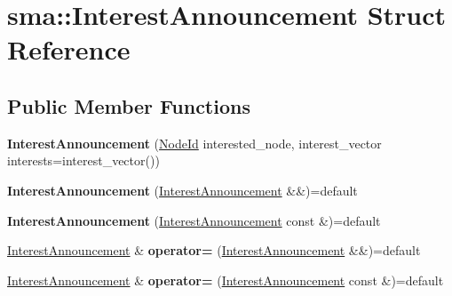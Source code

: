 \hypertarget{structsma_1_1InterestAnnouncement}{\section{sma\-:\-:Interest\-Announcement Struct Reference}
\label{structsma_1_1InterestAnnouncement}
}
\subsection*{Public Member Functions}
\begin{DoxyCompactItemize}
\item 
\hypertarget{structsma_1_1InterestAnnouncement_aebd1f782724e60862721d7e00a3e11fe}{{\bfseries Interest\-Announcement} (\hyperlink{structsma_1_1NodeId}{Node\-Id} interested\-\_\-node, interest\-\_\-vector interests=interest\-\_\-vector())}\label{structsma_1_1InterestAnnouncement_aebd1f782724e60862721d7e00a3e11fe}

\item 
\hypertarget{structsma_1_1InterestAnnouncement_ab17687b56d4191e0e3dae65c74ca5c44}{{\bfseries Interest\-Announcement} (\hyperlink{structsma_1_1InterestAnnouncement}{Interest\-Announcement} \&\&)=default}\label{structsma_1_1InterestAnnouncement_ab17687b56d4191e0e3dae65c74ca5c44}

\item 
\hypertarget{structsma_1_1InterestAnnouncement_a6f5c2300e99343d43bfa42327202832b}{{\bfseries Interest\-Announcement} (\hyperlink{structsma_1_1InterestAnnouncement}{Interest\-Announcement} const \&)=default}\label{structsma_1_1InterestAnnouncement_a6f5c2300e99343d43bfa42327202832b}

\item 
\hypertarget{structsma_1_1InterestAnnouncement_a5a4fcc3853c90e5c822499bdeba48464}{\hyperlink{structsma_1_1InterestAnnouncement}{Interest\-Announcement} \& {\bfseries operator=} (\hyperlink{structsma_1_1InterestAnnouncement}{Interest\-Announcement} \&\&)=default}\label{structsma_1_1InterestAnnouncement_a5a4fcc3853c90e5c822499bdeba48464}

\item 
\hypertarget{structsma_1_1InterestAnnouncement_abb392204e8e15291f7c7ac219da726e1}{\hyperlink{structsma_1_1InterestAnnouncement}{Interest\-Announcement} \& {\bfseries operator=} (\hyperlink{structsma_1_1InterestAnnouncement}{Interest\-Announcement} const \&)=default}\label{structsma_1_1InterestAnnouncement_abb392204e8e15291f7c7ac219da726e1}

\end{DoxyCompactItemize}
